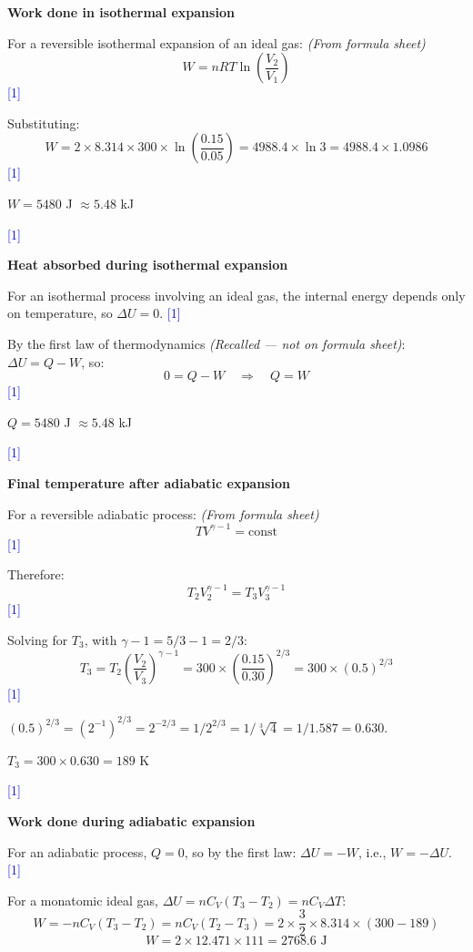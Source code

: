 \documentclass[12pt,a4paper]{article}
\newcommand{\markstep}[1]{\hfill\textcolor{blue}{[#1]}}
\newcommand{\finalanswer}[1]{%
  \begin{tcolorbox}[colback=green!5!white,colframe=green!50!black,boxrule=0.5pt]
  #1
  \end{tcolorbox}
}
\newcommand{\fromsheet}{\textit{(From formula sheet)}}
\newcommand{\recalled}{\textit{(Recalled --- not on formula sheet)}}
\begin{document}
\begin{parts}

\item \textbf{Work done in isothermal expansion} 

For a reversible isothermal expansion of an ideal gas: \fromsheet
\[
W = nRT\ln\!\left(\frac{V_2}{V_1}\right)
\]
\markstep{1}

Substituting:
\[
W = 2\times 8.314\times 300\times\ln\!\left(\frac{0.15}{0.05}\right) = 4988.4\times\ln 3 = 4988.4\times 1.0986
\]
\markstep{1}

\finalanswer{$W = 5480$ J $\approx 5.48$ kJ}
\markstep{1}

\item \textbf{Heat absorbed during isothermal expansion} 

For an isothermal process involving an ideal gas, the internal energy depends only on temperature, so $\Delta U = 0$. \markstep{1}

By the first law of thermodynamics \recalled: $\Delta U = Q - W$, so:
\[
0 = Q - W \quad\Rightarrow\quad Q = W
\]
\markstep{1}

\finalanswer{$Q = 5480$ J $\approx 5.48$ kJ}
\markstep{1}

\item \textbf{Final temperature after adiabatic expansion} 

For a reversible adiabatic process: \fromsheet
\[
TV^{\gamma-1} = \text{const}
\]
\markstep{1}

Therefore:
\[
T_2 V_2^{\gamma-1} = T_3 V_3^{\gamma-1}
\]
\markstep{1}

Solving for $T_3$, with $\gamma - 1 = 5/3 - 1 = 2/3$:
\[
T_3 = T_2\left(\frac{V_2}{V_3}\right)^{\gamma-1} = 300\times\left(\frac{0.15}{0.30}\right)^{2/3} = 300\times(0.5)^{2/3}
\]
\markstep{1}

$(0.5)^{2/3} = (2^{-1})^{2/3} = 2^{-2/3} = 1/2^{2/3} = 1/\sqrt[3]{4} = 1/1.587 = 0.630$.

\finalanswer{$T_3 = 300\times 0.630 = 189$ K}
\markstep{1}

\item \textbf{Work done during adiabatic expansion} 

For an adiabatic process, $Q = 0$, so by the first law: $\Delta U = -W$, i.e., $W = -\Delta U$. \markstep{1}

For a monatomic ideal gas, $\Delta U = nC_V(T_3 - T_2) = nC_V\Delta T$:
\[
W = -nC_V(T_3 - T_2) = nC_V(T_2 - T_3) = 2\times\frac{3}{2}\times 8.314\times(300 - 189)
\]
\[
W = 2\times 12.471\times 111 = 2768.6\text{ J}
\]


\end{parts}
\end{document}
